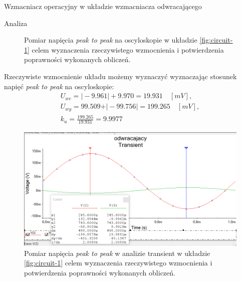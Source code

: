 \documentclass[a4paper]{scrartcl}
\begin{document}
\begin{section}{Wzmacniacz operacyjny w układzie wzmacniacza odwracającego}
\begin{subsection}{Analiza}
\begin{figure}[ht]
\begin{center}
					\caption{Pomiar napięcia \textit{peak to peak} na oscyloskopie w układzie \ref{fig:circuit-1} celem wyznaczenia rzeczywistego wzmocnienia i potwierdzenia poprawności wykonanych obliczeń.}
				\end{center}
				\end{figure}
				\pagebreak

				Rzeczywiste wzmocnienie układu możemy wyznaczyć wyznaczając stosunek napięć \textit{peak to peak} na oscyloskopie:%
				\begin{gather*}
					U_{we} = \vert-9.961\vert + 9.970 = 19.931\quad [mV], \\
					U_{wy} = 99.509 + \vert-99.756\vert = 199.265 \quad [mV],\\
					k_{u} = \frac{199.265}{19.931} = 9.9977 
				\end{gather*}

				\begin{figure}[!ht]
				\begin{center}
					\includegraphics[width=0.7\linewidth,scale=2]{03-peak2peak}
					\caption{Pomiar napięcia \textit{peak to peak} w analizie transient w układzie \ref{fig:circuit-1} celem wyznaczenia rzeczywistego wzmocnienia i potwierdzenia poprawności wykonanych obliczeń.}
					\label{fig:circuit-1-transient}
				\end{center}
				\end{figure}


\end{subsection}
\end{section}
\end{document}
